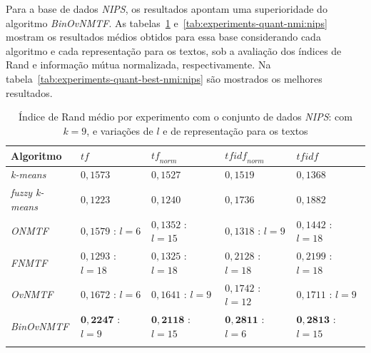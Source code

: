 \documentclass[
    12pt,                %
    oneside,            %
    a4paper,            %
    english,            %
    brazil                %
    ]{abntex2ppgsi}
\begin{document}

Para a base de dados \textit{NIPS}, os resultados apontam uma superioridade do algoritmo \textit{BinOvNMTF}. As tabelas~\ref{tab:experiments-quant-rand:nips} e~\ref{tab:experiments-quant-nmi:nips} mostram os resultados médios obtidos para essa base considerando cada algoritmo e cada representação para os textos, sob a avaliação dos índices de Rand e informação mútua normalizada, respectivamente. Na tabela~\ref{tab:experiments-quant-best-nmi:nips} são mostrados os melhores resultados.

\begin{table}[H]
\centering
    \caption{Índice de Rand médio por experimento com o conjunto de dados \textit{NIPS}: com $k = 9$, e variações de $l$ e de representação para os textos}
    \begin{tabular}{lllll}
        \hline
        \textbf{Algoritmo}              & $\textit{tf}$ & $\textit{tf}_{norm}$ & $\textit{tfidf}_{norm}$ & $\textit{tfidf}$ \\
        \hline
        \textit{k-means}       & $0,1573$            & $0,1527$            & $0,1519$            & $0,1368$ \\
        \textit{fuzzy k-means} & $0,1223$            & $0,1240$            & $0,1736$            & $0,1882$ \\
        \textit{ONMTF}         & $0,1579$ : $l = 6$  & $0,1352$ : $l = 15$ & $0,1318$ : $l = 9$  & $0,1442$ : $l = 18$ \\
        \textit{FNMTF}         & $0,1293$ : $l = 18$ & $0,1325$ : $l = 18$ & $0,2128$ : $l = 18$ & $0,2199$ : $l = 18$ \\
        \textit{OvNMTF}        & $0,1672$ : $l = 6$  & $0,1641$ : $l = 9$  & $0,1742$ : $l = 12$ & $0,1711$ : $l = 9$ \\
        \textit{BinOvNMTF}     & $\mathbf{0,2247}$ : $l = 9$ & $\mathbf{0,2118}$ : $l = 15$ & $\mathbf{0,2811}$ : $l = 6$ & $\mathbf{0,2813}$ : $l = 15$ \\
        \hline \\
    \end{tabular}
    \label{tab:experiments-quant-rand:nips}
\end{table}
\end{document}
